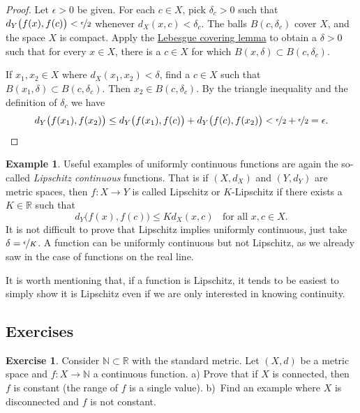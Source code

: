 \documentclass[12pt]{book}
\newcommand{\R}{{\mathbb{R}}}
\newcommand{\N}{{\mathbb{N}}}
\newcommand{\myindex}[1]{#1\index{#1}}
\theoremstyle{plain}
\theoremstyle{remark}
\theoremstyle{definition}
\theoremstyle{exercise}
\newtheorem{exercise}{Exercise}[section]
\theoremstyle{example}
\newtheorem{example}[thm]{Example}
\begin{document}
\begin{proof}
Let $\epsilon > 0$ be given.  For each $c \in X$, pick $\delta_c > 0$ such that
$d_Y\bigl(f(x),f(c)\bigr) < \nicefrac{\epsilon}{2}$
whenever
$d_X(x,c) < \delta_c$.
The balls
$B(c,\delta_c)$ cover $X$, and the space $X$ is compact.  
Apply the \hyperref[ms:lebesgue]{Lebesgue covering lemma} to obtain a 
$\delta > 0$ such that for every $x \in X$, there is a $c \in X$
for which $B(x,\delta) \subset B(c,\delta_c)$.

If $x_1, x_2 \in X$ where $d_X(x_1,x_2) < \delta$,
find a $c \in X$ such that $B(x_1,\delta) \subset B(c,\delta_c)$.
Then $x_2 \in B(c,\delta_c)$.  By the triangle inequality
and the definition of $\delta_c$ we have
\begin{equation*}
d_Y\bigl(f(x_1),f(x_2)\bigr)
\leq
d_Y\bigl(f(x_1),f(c)\bigr)
+
d_Y\bigl(f(c),f(x_2)\bigr)
<
\nicefrac{\epsilon}{2}+
\nicefrac{\epsilon}{2} = \epsilon .  \qedhere
\end{equation*}
\end{proof}

\begin{example}
Useful examples of uniformly continuous functions are again the so-called
\emph{\myindex{Lipschitz continuous}} functions.  That is if
$(X,d_X)$ and $(Y,d_Y)$ are metric spaces, then $f \colon X \to Y$
is called Lipschitz or $K$-Lipschitz if there exists a $K \in \R$ such that
\begin{equation*}
d_Y\bigl(f(x),f(c)\bigr) \leq K d_X(x,c)
\ \ \ \ \text{for all } x,c \in X.
\end{equation*}
It is not difficult to prove that Lipschitz implies uniformly continuous,
just take $\delta = \nicefrac{\epsilon}{K}$.
A function can be uniformly continuous
but not Lipschitz,
as we already saw in the case
of functions on the real line.

It is worth mentioning that,
if a function is Lipschitz, it tends to be
easiest to simply show it is Lipschitz even if we are only
interested in knowing continuity.
\end{example}

\subsection{Exercises}

\begin{exercise}
Consider $\N \subset \R$ with the standard metric.  Let $(X,d)$ be a
metric space and $f \colon X \to \N$ a continuous function.  a) Prove that
if $X$ is connected, then $f$ is constant (the range of $f$ is a single
value).  b)~Find an example where $X$ is disconnected and $f$ is not constant.
\end{exercise}
\end{document}
